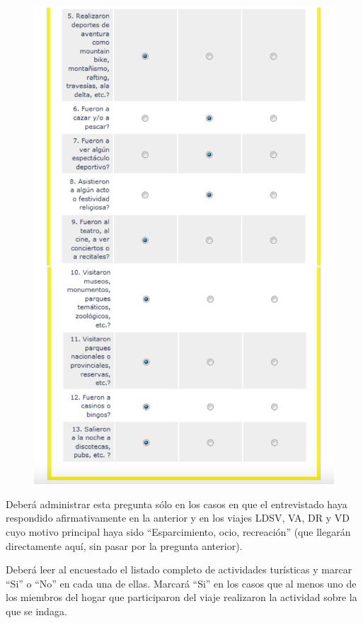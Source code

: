 \documentclass[
  openany]{book}
\begin{document}
\begin{figure}

{\centering \includegraphics[width=1\linewidth]{imagenes/figura6-114} 

}

\end{figure}

Deberá administrar esta pregunta sólo en los casos en que el entrevistado haya respondido afirmativamente en la anterior y en los viajes LDSV, VA, DR y VD cuyo motivo principal haya sido ``Esparcimiento, ocio, recreación'' (que llegarán directamente aquí, sin pasar por la pregunta anterior).

Deberá leer al encuestado el listado completo de actividades turísticas y marcar ``Si'' o ``No'' en cada una de ellas. Marcará ``Si'' en los casos que al menos uno de los miembros del hogar que participaron del viaje realizaron la actividad sobre la que se indaga.
\end{document}
